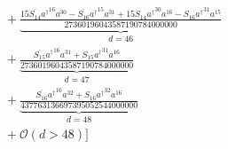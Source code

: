 \begin{align}
  &\quad + \underbrace{\frac{15 \overline{{S}_{14}} {{a}^\dagger}^{16} {a}^{30} - \overline{{S}_{16}} {{a}^\dagger}^{15} {a}^{31} + 15 {S}_{14} {{a}^\dagger}^{30} {a}^{16} - {S}_{16} {{a}^\dagger}^{31} {a}^{15}}{27360196043587190784000000}}_{d=46} \\
  &\quad + \underbrace{\frac{\overline{{S}_{15}} {{a}^\dagger}^{16} {a}^{31} + {S}_{15} {{a}^\dagger}^{31} {a}^{16}}{27360196043587190784000000}}_{d=47} \\
  &\quad + \underbrace{\frac{\overline{{S}_{16}} {{a}^\dagger}^{16} {a}^{32} + {S}_{16} {{a}^\dagger}^{32} {a}^{16}}{437763136697395052544000000}}_{d=48} \\
  &\quad + \mathcal O(d>48)\Bigr]
\end{align}
